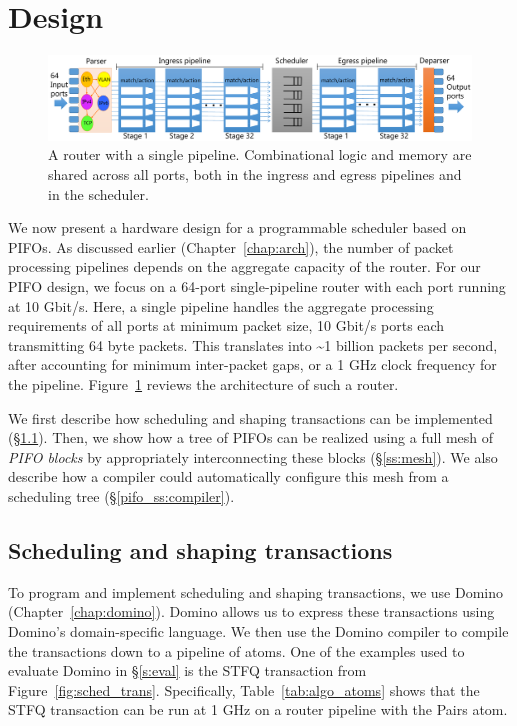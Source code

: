 \section{Design}
\label{s:design}

\begin{figure}
  \centering
  \includegraphics[width=\textwidth]{pifo_router_pipeline.pdf}
  \caption{A router with a single pipeline. Combinational logic and memory are
  shared across all ports, both in the ingress and egress pipelines and in the
  scheduler.}
  \label{pifo_fig:router}
\end{figure}

We now present a hardware design for a programmable scheduler based on PIFOs.
As discussed earlier (Chapter~\ref{chap:arch}), the number of packet processing
pipelines depends on the aggregate capacity of the router. For our PIFO design,
we focus on a 64-port single-pipeline router with each port running at 10
Gbit/s. Here, a single pipeline handles the aggregate processing requirements
of all ports at minimum packet size,  10 Gbit/s ports each transmitting
64 byte packets. This translates into \textasciitilde 1 billion packets per
second, after accounting for minimum inter-packet gaps, or a 1 GHz clock
frequency for the pipeline.  Figure~\ref{pifo_fig:router} reviews the
architecture of such a router.
 
We first describe how scheduling and shaping transactions can be implemented
(\S\ref{ss:transactions}). Then, we show how a tree of PIFOs can be realized
using a full mesh of {\em PIFO blocks} by appropriately interconnecting these
blocks (\S\ref{ss:mesh}). We also describe how a compiler could automatically
configure this mesh from a scheduling tree (\S\ref{pifo_ss:compiler}).

\subsection{Scheduling and shaping transactions}
\label{ss:transactions}
To program and implement scheduling and shaping transactions, we use Domino
(Chapter~\ref{chap:domino}). Domino allows us to express these transactions
using Domino's domain-specific language. We then use the Domino compiler to
compile the transactions down to a pipeline of \absmachine atoms.  One of the
examples used to evaluate Domino in \S\ref{s:eval} is the STFQ transaction from
Figure~\ref{fig:sched_trans}.  Specifically, Table~\ref{tab:algo_atoms} shows
that the STFQ transaction can be run at 1 GHz on a router pipeline with the
Pairs atom.

